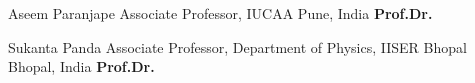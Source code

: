 


\begin{cvhonors}


\cvhonor
{Aseem Paranjape} %
{Associate Professor, IUCAA} %
{Pune, India} %
{\textbf{  Prof.Dr.}} %



\cvhonor
{Sukanta Panda} %
{Associate Professor, Department of Physics, IISER Bhopal} %
{Bhopal, India} %
{\textbf{  Prof.Dr.}} %


\end{cvhonors}
